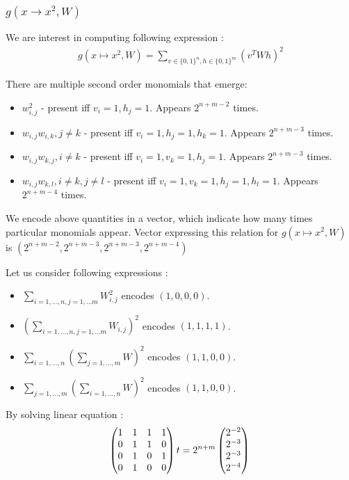 \documentclass{article}
\begin{document}
\subsubsection{$g(x \rightarrow x^2, W)$}

We are interest in computing following expression : 
\begin{gather*}
	g(x \mapsto x^2, W) = \sum_{v \in \{0, 1\}^n, h \in \{0, 1\}^m} (v^TWh)^2
\end{gather*}

There are multiple second order monomials that emerge: 

\begin{itemize}
	\item $w_{i,j}^2$ - present iff $v_i = 1, h_j = 1$. Appears $2^{n + m - 2}$ times.
	\item $w_{i,j} w_{i, k}, j \neq k$ - present iff $v_i = 1, h_j = 1, h_k = 1$. Appears $2^{n + m - 3}$ times.	
	\item $w_{i,j} w_{k, j}, i \neq k$ - present iff $v_i = 1, v_k = 1, h_j = 1$. Appears $2^{n + m - 3}$ times.
	\item $w_{i,j} w_{k, l}, i \neq k, j \neq l$ - present iff $v_i = 1, v_k = 1, h_j = 1, h_l = 1$. Appears $2^{n + m - 4}$ times.			
\end{itemize}
We encode above quantities in a vector, which indicate how many times particular monomials 
appear. Vector expressing this relation for $g(x \mapsto x^2, W)$ is $(2^{n + m - 2}, 2^{n + m - 3}, 2^{n + m - 3}, 2^{n + m - 4})$


Let us consider following expressions : 
\begin{itemize}
 \item $\sum_{i = 1, \dots, n, j = 1, \dots m} W_{i, j}^2$ encodes $(1, 0, 0, 0)$. 
 \item $(\sum_{i = 1, \dots, n, j = 1, \dots m} W_{i, j})^2$ encodes $(1, 1, 1, 1)$.
 \item $\sum_{i = 1, \dots, n}(\sum_{j = 1, \dots, m} W)^2$ encodes $(1, 1, 0, 0)$. 
 \item $\sum_{j = 1, \dots, m}(\sum_{i = 1, \dots, n} W)^2$ encodes $(1, 1, 0, 0)$. 
\end{itemize}
 
 By solving linear equation :
 \begin{equation}
 \begin{pmatrix} 
  1 & 1 & 1 & 1 \\ 
  0 & 1 & 1 & 0 \\ 
  0 & 1 & 0 & 1 \\ 
  0 & 1 & 0 & 0 \\     
\end{pmatrix}t = 2^{n + m}\begin{pmatrix} 
  2^{-2}\\ 
  2^{-3}\\ 
  2^{-3}\\ 
  2^{-4}\\     
\end{pmatrix} \\
 \end{equation}
\end{document}
